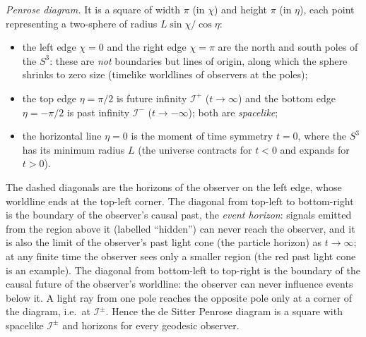 \documentclass[12pt]{article}
\begin{document}
\begin{enumerate}[label=\alph*)]
\emph{Penrose diagram.} It is a square of width $\pi$ (in $\chi$) and height $\pi$ (in $\eta$), each point representing a two-sphere of radius $L\sin\chi/\cos\eta$:
\begin{itemize}
\item the left edge $\chi=0$ and the right edge $\chi=\pi$ are the north and south poles of the $S^3$: these are \emph{not} boundaries but lines of origin, along which the sphere shrinks to zero size (timelike worldlines of observers at the poles);
\item the top edge $\eta=\pi/2$ is future infinity $\mathcal I^+$ ($t\to\infty$) and the bottom edge $\eta=-\pi/2$ is past infinity $\mathcal I^-$ ($t\to-\infty$); both are \emph{spacelike};
\item the horizontal line $\eta=0$ is the moment of time symmetry $t=0$, where the $S^3$ has its minimum radius $L$ (the universe contracts for $t<0$ and expands for $t>0$).
\end{itemize}

\begin{center}
\end{center}
The dashed diagonals are the horizons of the observer on the left edge, whose worldline ends at the top-left corner. The diagonal from top-left to bottom-right is the boundary of the observer's causal past, the \emph{event horizon}: signals emitted from the region above it (labelled ``hidden'') can never reach the observer, and it is also the limit of the observer's past light cone (the particle horizon) as $t\to\infty$; at any finite time the observer sees only a smaller region (the red past light cone is an example). The diagonal from bottom-left to top-right is the boundary of the causal future of the observer's worldline: the observer can never influence events below it. A light ray from one pole reaches the opposite pole only at a corner of the diagram, i.e.\ at $\mathcal I^\pm$. Hence the de Sitter Penrose diagram is a square with spacelike $\mathcal I^\pm$ and horizons for every geodesic observer.
\end{enumerate}
\end{document}
